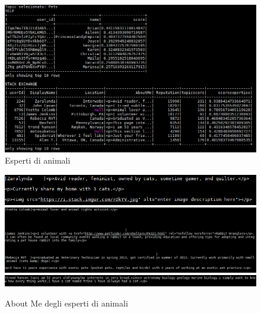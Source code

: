 \begin{figure}[H]
	\centering
	\includegraphics[scale=0.7]{image/pets.PNG}
	\caption{Esperti di animali}
	\label{fig:pets}
\end{figure}
\begin{figure}[H]
	\centering
	\includegraphics[scale=0.8]{image/pets2.PNG}
	\includegraphics[width=16cm]{image/pets3.PNG}
	\includegraphics[width=16cm]{image/pets4.PNG}
	\caption{About Me degli esperti di animali}
	\label{fig:abme}
\end{figure}

